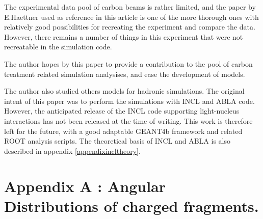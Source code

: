 The experimental data pool of carbon beams is rather limited, and the paper by E.Haettner used as reference in this article is one of the more thorough ones with relatively good possibilities for recreating the experiment and compare the data. However, there remains a number of things in this experiment that were not recreatable in the simulation code.

The author hopes by this paper to provide a contribution to the pool of carbon treatment related simulation analysises, and ease the development of models.

The author also studied others models for hadronic simulations. The original intent of this paper was to perform the simulations with INCL and ABLA code. However, the anticipated release of the INCL code supporting light-nucleus interactions has not been released at the time of writing. This work is therefore left for the future, with a good adaptable GEANT4b framework and related ROOT analysis scripts. The theoretical basis of INCL and ABLA is also described in appendix \ref{appendixincltheory}.

\clearpage

  

\appendix 

\clearpage
{}
\section*{Appendix A \label{AppendixA}: Angular Distributions of charged fragments.\label{AngularDistributionAppendix}}

\renewcommand{\theequation}{A\arabic{equation}}
\setcounter{equation}{0}  
\renewcommand{\thefigure}{A\arabic{figure}}
\setcounter{figure}{0}
\renewcommand{\thetable}{A\arabic{table}}
\setcounter{table}{0}
\renewcommand\thesection{A}
\setcounter{section}{1}


